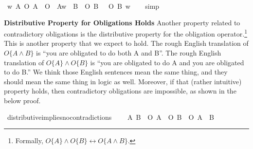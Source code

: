 \begin{isabellebody}
\begin{isamarkuptext}
\medskip%
\end{isamarkuptext}\isamarkuptrue%
\isamarkupfalse%
\ {\isachardoublequoteopen}{\isasymforall}w{\isachardot}\ {\isasymexists}A{\isachardot}\ {\isacharparenleft}{\isacharparenleft}{\isacharparenleft}O\ {\isacharbraceleft}A{\isacharbraceright}\ \isactrlbold {\isasymand}\ O\ {\isacharbraceleft}\isactrlbold {\isasymnot}\ A{\isacharbraceright}{\isacharparenright}w{\isacharparenright}{\isacharparenright}\ {\isasymequiv}\ {\isacharparenleft}{\isasymexists}B{\isachardot}\ {\isacharparenleft}\isactrlbold {\isasymnot}\ {\isacharparenleft}O\ {\isacharbraceleft}B{\isacharbraceright}\ \isactrlbold {\isasymrightarrow}\ \isactrlbold {\isasymnot}\ O\ {\isacharbraceleft}\isactrlbold {\isasymnot}B{\isacharbraceright}{\isacharparenright}{\isacharparenright}\ w{\isacharparenright}{\isachardoublequoteclose}\isanewline
%
\isadelimproof
\ \ %
\endisadelimproof
%
\isatagproof
{}\isamarkupfalse%
\ simp\isanewline
%
\isanewline
%
%
\endisatagproof
{\isafoldproof}%
%
\isadelimproof
%
\endisadelimproof
%
\begin{isamarkuptext}%
\noindent \textbf{Distributive Property for Obligations Holds} Another property related to contradictory obligations is the distributive property for the obligation
operator.\footnote{Formally, $O\{A\} \wedge O\{B\} \longleftrightarrow O\{A \wedge B\}$.} This is 
another property that we expect to hold. The rough English translation of  $O \{ A \wedge B \} $ is ``you are obligated to 
do both A and B''. The rough English translation of $O\{A\} \wedge O\{B\}$ is ``you are obligated to do A 
and you are obligated to do B.'' We think those English sentences mean the same thing, and they should mean 
the same thing in logic as well. Moreover, if that (rather intuitive) property holds, then contradictory
obligations are impossible, as shown in the below proof.%
\end{isamarkuptext}\isamarkuptrue%
\isamarkupfalse%
\ distributive{\isacharunderscore}implies{\isacharunderscore}no{\isacharunderscore}contradictions{\isacharcolon}\ \isanewline
\ \ \ {\isachardoublequoteopen}{\isasymforall}A\ B{\isachardot}\ {\isasymTurnstile}\ {\isacharparenleft}{\isacharparenleft}O\ {\isacharbraceleft}A{\isacharbraceright}\ \isactrlbold {\isasymand}\ O\ {\isacharbraceleft}B{\isacharbraceright}{\isacharparenright}\ \isactrlbold {\isasymequiv}\ O\ {\isacharbraceleft}A\ \isactrlbold {\isasymand}\ B{\isacharbraceright}{\isacharparenright}{\isachardoublequoteclose}\isanewline

\end{isabellebody}
